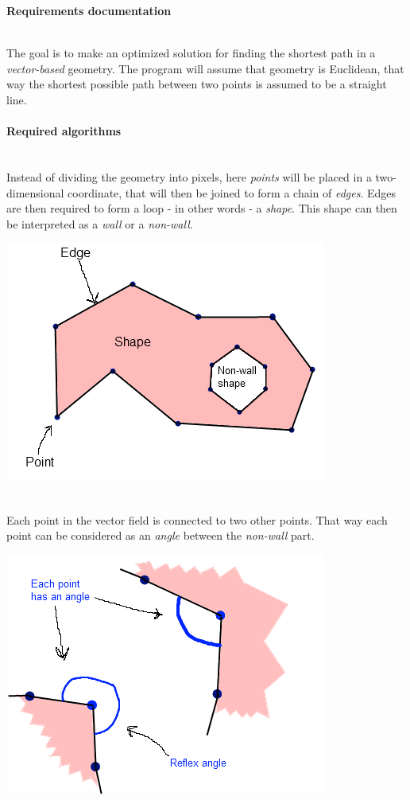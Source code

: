 \documentclass[a4paper,12pt]{article}
\begin{document}
\centerline{\huge \textbf{Requirements documentation}} \hspace*{\fill}
\\
The goal is to make an optimized solution for finding the shortest path in a \emph{vector-based} geometry. The program will assume that geometry is Euclidean, that way the shortest possible path between two points is assumed to be a straight line.
\paragraph{Required algorithms} \hspace{0pt} \\
\indent Instead of dividing the geometry into pixels, here \emph{points} will be placed in a two-dimensional coordinate, that will then be joined to form a chain of \emph{edges}. Edges are then required to form a loop - in other words - a \emph{shape}. This shape can then be interpreted as a \emph{wall} or a \emph{non-wall}.
\\
\centerline{\includegraphics[scale=0.5]{pointedgeshape.png}} \hspace*{\fill}
\\
\indent Each point in the vector field is connected to two other points. That way each point can be considered as an \emph{angle} between the \emph{non-wall} part.
\\
\centerline{\includegraphics[scale=0.5]{pointsandangles.png}} \hspace*{\fill}
\end{document}
